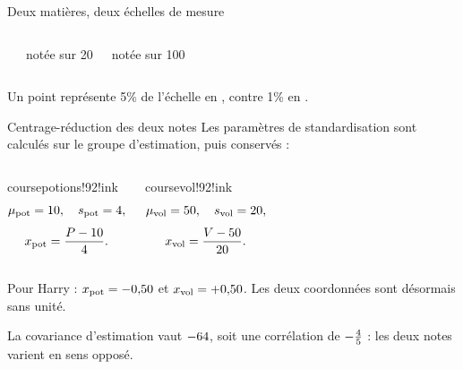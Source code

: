 \begin{frame}[t]{Deux matières, deux échelles de mesure}
  \vspace{2mm}
  \begin{columns}[T,onlytextwidth]
      \centering
      {\bfseries\PotionsName}
      \par notée sur 20
      \centering
      {\bfseries\VolName}
      \par notée sur 100
  \end{columns}
  \vfill
  Un point représente 5\% de l'échelle en \PotionsName, contre 1\% en \VolName.
\end{frame}

\begin{frame}[t]{Centrage-réduction des deux notes}
  \vspace{2mm}
  Les paramètres de standardisation sont calculés sur le groupe d'estimation,
  puis conservés :
  \begin{columns}[T,onlytextwidth]
      \begin{coursecallout}{coursepotions!92!ink}{\PotionsName}
        \[
          \mu_{\mathrm{pot}}=10,
          \quad s_{\mathrm{pot}}=4,
        \]
        \[
          x_{\mathrm{pot}}=
          \frac{P-10}{4}.
        \]
      \end{coursecallout}
      \begin{coursecallout}{coursevol!92!ink}{\VolName}
        \[
          \mu_{\mathrm{vol}}=50,
          \quad s_{\mathrm{vol}}=20,
        \]
        \[
          x_{\mathrm{vol}}=
          \frac{V-50}{20}.
        \]
      \end{coursecallout}
  \end{columns}
  \vfill
  Pour Harry : \(x_{\mathrm{pot}}=-0{,}50\) et
  \(x_{\mathrm{vol}}=+0{,}50\). Les deux coordonnées sont désormais sans
  unité.
  \par\smallskip
  La covariance d'estimation vaut \(-64\), soit une
  corrélation de \(-\frac{4}{5}\) : les deux notes varient en sens
  opposé.
\end{frame}

